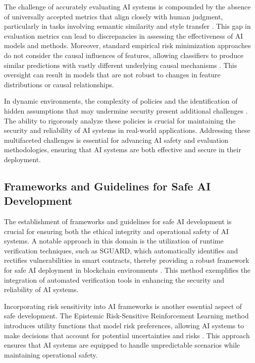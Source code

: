 The challenge of accurately evaluating AI systems is compounded by the absence of universally accepted metrics that align closely with human judgment, particularly in tasks involving semantic similarity and style transfer \cite{yamshchikov2020styletransferparaphraselookingsensible}. This gap in evaluation metrics can lead to discrepancies in assessing the effectiveness of AI models and methods. Moreover, standard empirical risk minimization approaches do not consider the causal influences of features, allowing classifiers to produce similar predictions with vastly different underlying causal mechanisms \cite{sen2018supervisingfeatureinfluence}. This oversight can result in models that are not robust to changes in feature distributions or causal relationships.

In dynamic environments, the complexity of policies and the identification of hidden assumptions that may undermine security present additional challenges \cite{kammller2020applyingisabelleinsiderframework}. The ability to rigorously analyze these policies is crucial for maintaining the security and reliability of AI systems in real-world applications. Addressing these multifaceted challenges is essential for advancing AI safety and evaluation methodologies, ensuring that AI systems are both effective and secure in their deployment.


\subsection{Frameworks and Guidelines for Safe AI Development} \label{subsec:Frameworks and Guidelines for Safe AI Development}

The establishment of frameworks and guidelines for safe AI development is crucial for ensuring both the ethical integrity and operational safety of AI systems. A notable approach in this domain is the utilization of runtime verification techniques, such as SGUARD, which automatically identifies and rectifies vulnerabilities in smart contracts, thereby providing a robust framework for safe AI deployment in blockchain environments \cite{nguyen2021sguardfixingvulnerablesmart}. This method exemplifies the integration of automated verification tools in enhancing the security and reliability of AI systems.



Incorporating risk sensitivity into AI frameworks is another essential aspect of safe development. The Epistemic Risk-Sensitive Reinforcement Learning method introduces utility functions that model risk preferences, allowing AI systems to make decisions that account for potential uncertainties and risks \cite{eriksson2019epistemicrisksensitivereinforcementlearning}. This approach ensures that AI systems are equipped to handle unpredictable scenarios while maintaining operational safety.



